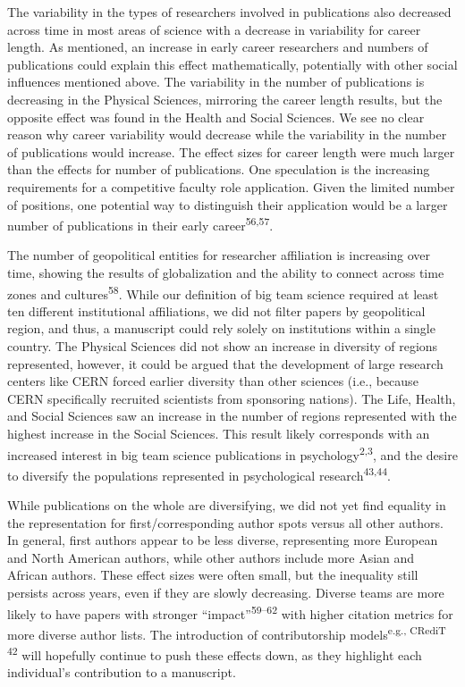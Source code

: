 \documentclass[
  man,floatsintext]{apa6}
\begin{document}
The variability in the types of researchers involved in publications
also decreased across time in most areas of science with a decrease in
variability for career length. As mentioned, an increase in early career
researchers and numbers of publications could explain this effect
mathematically, potentially with other social influences mentioned
above. The variability in the number of publications is decreasing in
the Physical Sciences, mirroring the career length results, but the
opposite effect was found in the Health and Social Sciences. We see no
clear reason why career variability would decrease while the variability
in the number of publications would increase. The effect sizes for
career length were much larger than the effects for number of
publications. One speculation is the increasing requirements for a
competitive faculty role application. Given the limited number of
positions, one potential way to distinguish their application would be a
larger number of publications in their early career\textsuperscript{56,57}.

The number of geopolitical entities for researcher affiliation is
increasing over time, showing the results of globalization and the
ability to connect across time zones and cultures\textsuperscript{58}. While our
definition of big team science required at least ten different
institutional affiliations, we did not filter papers by geopolitical
region, and thus, a manuscript could rely solely on institutions within
a single country. The Physical Sciences did not show an increase in
diversity of regions represented, however, it could be argued that the
development of large research centers like CERN forced earlier diversity
than other sciences (i.e., because CERN specifically recruited
scientists from sponsoring nations). The Life, Health, and Social
Sciences saw an increase in the number of regions represented with the
highest increase in the Social Sciences. This result likely corresponds
with an increased interest in big team science publications in
psychology\textsuperscript{2,3}, and the desire to diversify the
populations represented in psychological research\textsuperscript{43,44}.

While publications on the whole are diversifying, we did not yet find
equality in the representation for first/corresponding author spots
versus all other authors. In general, first authors appear to be less
diverse, representing more European and North American authors, while
other authors include more Asian and African authors. These effect sizes
were often small, but the inequality still persists across years, even
if they are slowly decreasing. Diverse teams are more likely to have
papers with stronger ``impact''\textsuperscript{59--62} with higher citation metrics for more diverse author lists.
The introduction of contributorship models\textsuperscript{e.g., CRediT 42}
will hopefully continue to push these effects down, as they highlight
each individual's contribution to a manuscript.
\end{document}
